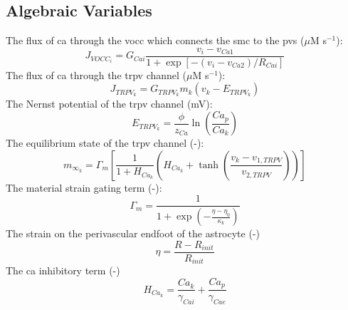\documentclass[11pt]{elsarticle}
\newcommand{\mus}{$\mu$M s$^{-1}$\xspace}
\newcommand{\ca}{\gls{ca}\xspace}
\begin{document}
		\subsection{Algebraic Variables}	
%
The flux of \ca through the \gls{vocc} which connects the \gls{smc} to the \gls{pvs} (\mus):
\begin{equation}
J_{VOCC_i} = G_{Cai} \frac{v_i - v_{Ca1}}{1 + \exp \left[-(v_i - v_{Ca2})/R_{Cai} \right]} 
\end{equation}
%
The flux of \ca through the \gls{trpv} channel (\mus):
\begin{equation}
J_{TRPV_k} = G_{TRPV_k} m_k (v_k - E_{TRPV_k})
\label{eq:Jtrpv}
\end{equation}
%			
The Nernst potential of the \gls{trpv} channel (mV):
\begin{equation}
E_{TRPV_k} = \frac{\phi}{z_{Ca}} \ln \left(\frac{Ca_p}{Ca_k} \right)
\end{equation}
%
The equilibrium state of the \gls{trpv} channel (-):
\begin{equation}
m_{\infty_k} =  \Gamma_m
				\left[
				\frac{1}{1 + H_{Ca_k}} \left( H_{Ca_k} + \tanh \left( \frac{v_k - v_{1,TRPV}}{v_{2,TRPV}} \right) \right) 
				\right] 
\end{equation}
%
The material strain gating term (-):
\begin{equation}
\Gamma_m = \frac{1}{1+\exp \left( {-\frac{\eta - \eta_0}{\kappa_k}} \right) }  
\end{equation}
%	
The strain on the perivascular endfoot of the astrocyte (-)
\begin{equation}
\eta = \frac{R - R_{init}}{R_{init}}
\end{equation}
%
The \ca inhibitory term (-)
\begin{equation}
H_{Ca_k} = \frac{Ca_k}{\gamma_{Cai}} + \frac{Ca_p}{\gamma_{Cae}}
\end{equation}
%
\end{document}
